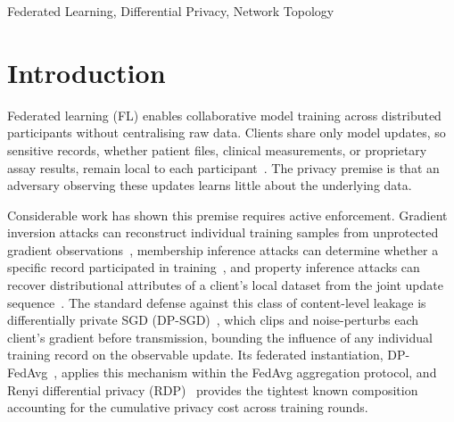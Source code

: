 \documentclass[letterpaper,journal]{IEEEtran}
\begin{document}
\begin{IEEEkeywords}
Federated Learning, Differential Privacy, Network Topology
\end{IEEEkeywords}

\section{Introduction}
\label{sec:intro}

Federated learning (FL) enables collaborative model training across
distributed participants without centralising raw data. Clients share
only model updates, so sensitive records, whether patient files,
clinical measurements, or proprietary assay results, remain local to
each participant~\cite{sheller2020medicine,dayan2021covid,melloddy2023,bonawitz2019sysml}.
The privacy premise is that an adversary observing these updates
learns little about the underlying data.

Considerable work has shown this premise requires active enforcement.
Gradient inversion attacks can reconstruct individual training samples
from unprotected gradient observations~\cite{zhu2019dlg,geiping2020inverting},
membership inference attacks can determine whether a specific record
participated in training~\cite{shokri2017membership}, and property
inference attacks can recover distributional attributes of a client's
local dataset from the joint update sequence~\cite{melis2019exploiting}.
The standard defense against this class of content-level leakage is
differentially private SGD (DP-SGD)~\cite{abadi2016dpsgd}, which
clips and noise-perturbs each client's gradient before transmission,
bounding the influence of any individual training record on the
observable update. Its federated instantiation, DP-FedAvg~\cite{mcmahan2018dpfedavg},
applies this mechanism within the FedAvg aggregation protocol, and
Renyi differential privacy (RDP)~\cite{mironov2017rdp} provides the
tightest known composition accounting for the cumulative privacy cost
across training rounds.
\end{document}
